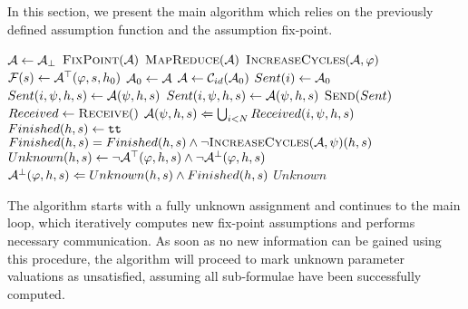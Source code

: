 In this section, we present the main algorithm which relies on the previously defined assumption function and the assumption fix-point.

\begin{algorithmic}
	\label{alg:main}
		\State $\mathcal{A} \gets \mathcal{A}_\bot$
		\Repeat
			\Repeat
				\State $\mathcal{\Call{FixPoint}{\assume}}$
				\State $\Call{MapReduce}{\assume}$
			\State $\Call{IncreaseCycles}{\assume, \varphi}$
		\State $\mathcal{F}(s) \gets \mathcal{A}^\top(\varphi, s, h_0)$
	\EndFunction
		\Repeat
			\State $\mathcal{A}_0 \gets \mathcal{A}$
			\State $\mathcal{A} \gets \mathcal{C}_{id}(\mathcal{A}_0)$
	\EndFunction
		\State $Sent(i) \gets \mathcal{A}_0$
				\State $Sent(i, \psi, h, s) \gets \mathcal{A}(\psi, h, s)$
			\EndFor
				\State $Sent(i, \psi, h, s) \gets \mathcal{A}(\psi, h, s)$
			\EndFor
		\EndFor
		\State $\Call{Send}{Sent}$
		\State $Received \gets \Call{Receive}$
		\State $\mathcal{A}(\psi, h, s) \Leftarrow \bigcup_{i < N} Received(i, \psi, h, s)$
	\EndFunction
		\State $Finished(h, s) \gets \texttt{tt} $
			\State $Finished(h, s) = Finished(h, s) \land \neg \Call{IncreaseCycles}{\mathcal{A}, \psi}(h, s)$
		\EndFor
		\State $Unknown(h, s) \gets \neg \mathcal{A}^\top(\varphi, h, s) \land \neg \mathcal{A}^\bot(\varphi, h, s)$		
		\State $\mathcal{A}^\bot(\varphi, h, s) \Leftarrow Unknown(h, s) \land Finished(h,s)$
		\State \Return $Unknown$
	\EndFunction	
\end{algorithmic}

The algorithm starts with a fully unknown assignment and continues to the main loop, which iteratively computes new fix-point assumptions and performs necessary communication. As soon as no new information can be gained using this procedure, the algorithm will proceed to mark unknown parameter valuations as unsatisfied, assuming all sub-formulae have been successfully computed.